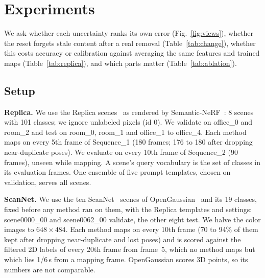 \documentclass[journal]{IEEEtran}
\begin{document}

\section{Experiments}
\label{sec:experiments}
We ask whether each uncertainty ranks its own error (Fig.~\ref{fig:views}), whether the reset forgets stale content after a real removal (Table~\ref{tab:change}), whether this costs accuracy or calibration against averaging the same features and trained maps (Table~\ref{tab:replica}), and which parts matter (Table~\ref{tab:ablation}).

\subsection{Setup}
\label{sec:setup}
\textbf{Replica.} We use the Replica scenes~\cite{straub2019replica} as rendered by Semantic-NeRF~\cite{zhi2021semanticnerf}: 8 scenes with 101 classes; we ignore unlabeled pixels (id 0). We validate on office\_0 and room\_2 and test on room\_0, room\_1 and office\_1 to office\_4. Each method maps on every 5th frame of Sequence\_1 (180 frames; 176 to 180 after dropping near-duplicate poses). We evaluate on every 10th frame of Sequence\_2 (90 frames), unseen while mapping. A scene's query vocabulary is the set of classes in its evaluation frames. One ensemble of five prompt templates, chosen on validation, serves all scenes.

\textbf{ScanNet.} We use the ten ScanNet~\cite{dai2017scannet} scenes of OpenGaussian~\cite{wu2024opengaussian} and its 19 classes, fixed before any method ran on them, with the Replica templates and settings: scene0000\_00 and scene0062\_00 validate, the other eight test. We halve the color images to $648\times484$. Each method maps on every 10th frame (70 to 94\% of them kept after dropping near-duplicate and lost poses) and is scored against the filtered 2D labels of every 20th frame from frame~5, which no method maps but which lies 1/6\,s from a mapping frame. OpenGaussian scores 3D points, so its numbers are not comparable.
\end{document}
